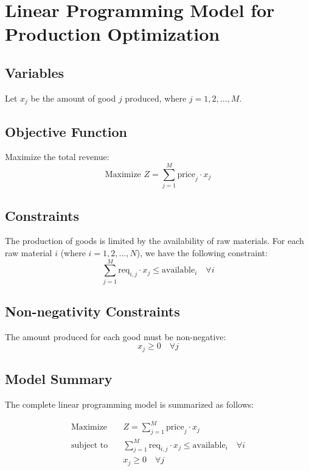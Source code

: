 \documentclass{article}
\begin{document}
\section*{Linear Programming Model for Production Optimization}

\subsection*{Variables}
Let \( x_j \) be the amount of good \( j \) produced, where \( j = 1, 2, \ldots, M \).

\subsection*{Objective Function}
Maximize the total revenue:
\[
\text{Maximize } Z = \sum_{j=1}^{M} \text{price}_j \cdot x_j
\]

\subsection*{Constraints}
The production of goods is limited by the availability of raw materials. For each raw material \( i \) (where \( i = 1, 2, \ldots, N \)), we have the following constraint:
\[
\sum_{j=1}^{M} \text{req}_{i,j} \cdot x_j \leq \text{available}_i \quad \forall i
\]

\subsection*{Non-negativity Constraints}
The amount produced for each good must be non-negative:
\[
x_j \geq 0 \quad \forall j
\]

\subsection*{Model Summary}
The complete linear programming model is summarized as follows:

\begin{align*}
\text{Maximize} \quad & Z = \sum_{j=1}^{M} \text{price}_j \cdot x_j \\
\text{subject to} \quad & \sum_{j=1}^{M} \text{req}_{i,j} \cdot x_j \leq \text{available}_i \quad \forall i \\
& x_j \geq 0 \quad \forall j
\end{align*}
\end{document}
